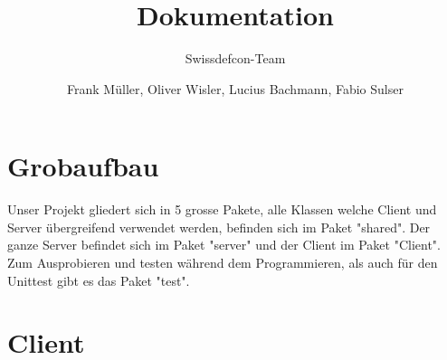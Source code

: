 \documentclass[ngerman, 12pt, pdftex]{scrartcl}[2006/07/30]
\title{Dokumentation}
\author{Frank M\"{u}ller, Oliver Wisler, Lucius Bachmann, Fabio Sulser}
\subtitle{Swissdefcon-Team}
\begin{document}
\pagestyle{fancy}
\fancyhf{} 
\fancyhead[R]{\thepage}  %
\renewcommand{\headrulewidth}{0.1pt} 	%



\maketitle


\newpage

\tableofcontents

\newpage

\section{Grobaufbau}
Unser Projekt gliedert sich in 5 grosse Pakete, alle Klassen welche Client und Server übergreifend verwendet werden, 
befinden sich im Paket "shared". Der ganze Server befindet sich im Paket "server" und der Client im Paket "Client".
Zum Ausprobieren und testen während dem Programmieren, als auch für den Unittest gibt es das Paket "test".

\section{Client}
\end{document}
